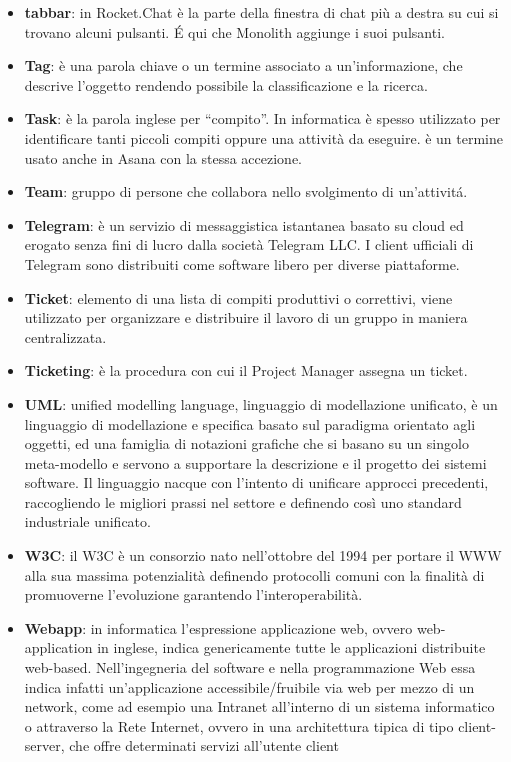 \begin{itemize}
\item[] \textbf{tabbar}: in Rocket.Chat è la parte della finestra di chat più a destra su cui si trovano alcuni pulsanti. \'E qui che Monolith aggiunge i suoi pulsanti.
\item[] \textbf{Tag}: è una parola chiave o un termine associato a un'informazione, che descrive l'oggetto rendendo possibile la classificazione e la ricerca.
\item[] \textbf{Task}: è la parola inglese per “compito”. In informatica è spesso utilizzato per identificare tanti piccoli compiti oppure una attività da eseguire. è un termine usato anche in Asana con la stessa accezione.
\item[] \textbf{Team}: gruppo di persone che collabora nello svolgimento di un'attivit\'a.
\item[] \textbf{Telegram}: è un servizio di messaggistica istantanea basato su cloud ed erogato senza fini di lucro dalla società Telegram LLC. I client ufficiali di Telegram sono distribuiti come software libero per diverse piattaforme.
\item[] \textbf{Ticket}: elemento di una lista di compiti produttivi o correttivi, viene utilizzato per organizzare e distribuire il lavoro di un gruppo in maniera centralizzata.
\item[] \textbf{Ticketing}: è la procedura con cui il Project Manager assegna un ticket.
\end{itemize}
\newpage

\begin{itemize}
\item[] \textbf{UML}: unified modelling language, linguaggio di modellazione unificato, è un linguaggio di modellazione e specifica basato sul paradigma orientato agli oggetti, ed una famiglia di notazioni grafiche che si basano su un singolo meta-modello e servono a supportare la descrizione e il progetto dei sistemi software. Il linguaggio nacque con l'intento di unificare approcci precedenti, raccogliendo le migliori prassi nel settore e definendo così uno standard industriale unificato.
\end{itemize}
\newpage

\begin{itemize}
\item[] \textbf{W3C}: il W3C è un consorzio nato nell'ottobre del 1994 per portare il WWW alla sua massima potenzialità definendo protocolli comuni con la finalità di promuoverne l'evoluzione garantendo l'interoperabilità.
\item[] \textbf{Webapp}: in informatica l'espressione applicazione web, ovvero web-application in inglese, indica genericamente tutte le applicazioni distribuite web-based. Nell'ingegneria del software e nella programmazione Web essa indica infatti un'applicazione accessibile/fruibile via web per mezzo di un network, come ad esempio una Intranet all'interno di un sistema informatico o attraverso la Rete Internet, ovvero in una architettura tipica di tipo client-server, che offre determinati servizi all'utente client
\end{itemize}
